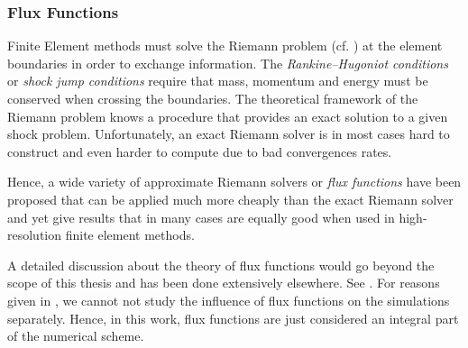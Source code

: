 \subsubsection{Flux Functions}
\label{sec:flux-functions}
Finite Element methods must solve the Riemann problem (cf. )
at the element boundaries in order to exchange information.  The
\emph{Rankine–Hugoniot conditions} or \emph{shock jump conditions} require that
mass, momentum and energy must be conserved when crossing the boundaries. The
theoretical framework of the Riemann problem knows a procedure that provides an
exact solution to a given shock problem. Unfortunately, an exact Riemann solver
is in most cases hard to construct and even harder to compute due to bad
convergences rates.

Hence, a wide variety of approximate Riemann solvers or \emph{flux functions}
have been proposed that can be applied much more cheaply than the exact Riemann
solver and yet give results that in many cases are equally good when used in
high-resolution finite element methods. 

A detailed discussion about the theory of flux functions would go beyond the
scope of this thesis and has been done extensively elsewhere. See
\cite{winters2016affordable,derigs2017novel}. For reasons given in
, we cannot not study the influence of flux
functions on the simulations separately. Hence, in this work, flux functions
are just considered an integral part of the numerical scheme.
